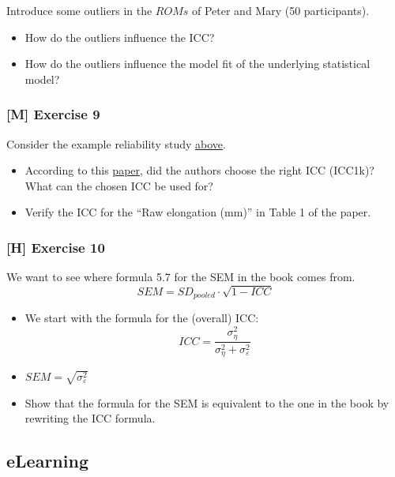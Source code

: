 \documentclass[
]{article}
\providecommand{\tightlist}{%
  \setlength{\itemsep}{0pt}\setlength{\parskip}{0pt}}
\begin{document}
Introduce some outliers in the \(ROMs\) of Peter and Mary (50 participants).

\begin{itemize}
\tightlist
\item
  How do the outliers influence the ICC?
\item
  How do the outliers influence the model fit of the underlying statistical model?
\end{itemize}

\subsubsection{{[}M{]} Exercise 9}\label{exercise9}

Consider the example reliability study \hyperref[example_RELStudy]{above}.

\begin{itemize}
\tightlist
\item
  According to this \href{https://www.sciencedirect.com/science/article/pii/S1556370716000158?via\%3Dihub}{paper},
  did the authors choose the right ICC (ICC1k)?
  What can the chosen ICC be used for?
\item
  Verify the ICC for the ``Raw elongation (mm)'' in Table 1 of the paper.
\end{itemize}

\subsubsection{{[}H{]} Exercise 10}\label{exercise10}

We want to see where formula 5.7 for the SEM in the book comes from.
\[SEM = SD_{pooled} \cdot \sqrt{1 - ICC}\]

\begin{itemize}
\item
  We start with the formula for the (overall) ICC:
  \[ICC = \frac{\sigma_{\eta}^2}{\sigma_{\eta}^2 + \sigma_{\varepsilon}^2}\]
\item
  \(SEM = \sqrt{\sigma_{\varepsilon}^2}\)
\item
  Show that the formula for the SEM is equivalent to the one in
  the book by rewriting the ICC formula.
\end{itemize}

\subsection{eLearning}\label{elearning}
\end{document}

